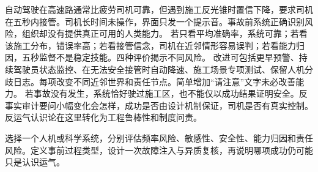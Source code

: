 自动驾驶在高速路通常比疲劳司机可靠，但遇到施工反光锥时置信下降，要求司机在五秒内接管。司机长时间未操作，界面只发一个提示音。事故前系统正确识别风险，组织却没有提供真正可用的人类能力。 若只看平均准确率，系统可靠；若看该施工分布，错误率高；若看接管信念，司机在近邻情形容易误判；若看能力归因，五秒监督不是稳定技能。四种评价揭示不同风险。 改进可包括更早预警、持续驾驶员状态监控、在无法安全接管时自动降速、施工场景专项测试、保留人机分歧日志。每项改变不同近邻世界和责任节点。简单增加“请注意”文字未必改善能力。 若事故没有发生，系统恰好驶过施工区，也不能仅以成功结果证明安全。反事实审计要问小幅变化会怎样，成功是否由设计机制保证，司机是否有真实控制。反运气认识论在这里转化为工程鲁棒性和制度问责。

\begin{tcolorbox}[breakable,colback=white,colframe=blue!30!black,title={专题研讨任务},fonttitle=\bfseries]
选择一个人机或科学系统，分别评估频率风险、敏感性、安全性、能力归因和责任风险。定义事前过程类型，设计一次故障注入与异质复核，再说明哪项成功仍可能只是认识运气。
\end{tcolorbox}
